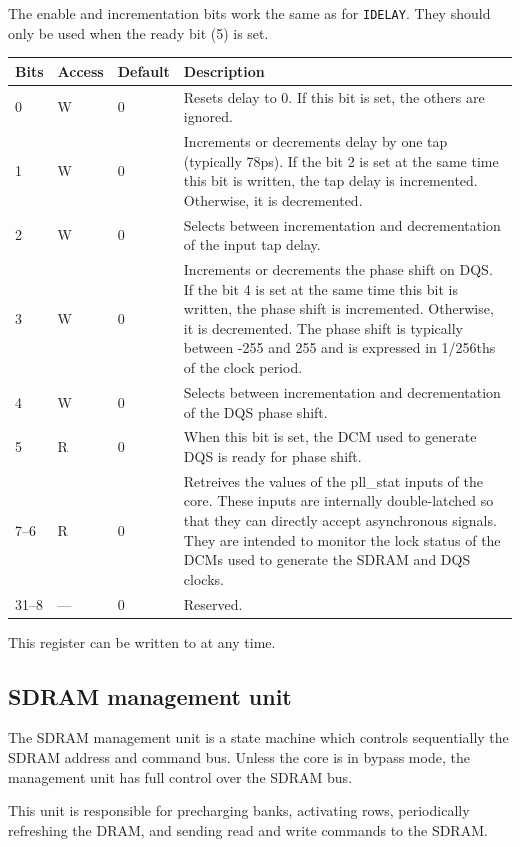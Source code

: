 \documentclass[a4paper,11pt]{article}
\begin{document}
The enable and incrementation bits work the same as for \verb!IDELAY!. They should only be used when the ready bit (5) is set.\\

\begin{tabularx}{\textwidth}{|l|l|l|X|}
\hline
\bf Bits & \bf Access & \bf Default & \bf Description \\
\hline
0 & W & 0 & Resets delay to 0. If this bit is set, the others are ignored. \\
\hline
1 & W & 0 & Increments or decrements delay by one tap (typically 78ps). If the bit 2 is set at the same time this bit is written, the tap delay is incremented. Otherwise, it is decremented. \\
\hline
2 & W & 0 & Selects between incrementation and decrementation of the input tap delay. \\
\hline
3 & W & 0 & Increments or decrements the phase shift on DQS. If the bit 4 is set at the same time this bit is written, the phase shift is incremented. Otherwise, it is decremented. The phase shift is typically between -255 and 255 and is expressed in 1/256ths of the clock period. \\
\hline
4 & W & 0 & Selects between incrementation and decrementation of the DQS phase shift. \\
\hline
5 & R & 0 & When this bit is set, the DCM used to generate DQS is ready for phase shift. \\
\hline
7--6 & R & 0 & Retreives the values of the pll\_stat inputs of the core. These inputs are internally double-latched so that they can directly accept asynchronous signals. They are intended to monitor the lock status of the DCMs used to generate the SDRAM and DQS clocks. \\
\hline
31--8 & --- & 0 & Reserved. \\
\hline
\end{tabularx}

This register can be written to at any time.


\subsection{SDRAM management unit}
The SDRAM management unit is a state machine which controls sequentially the SDRAM address and command bus. Unless the core is in bypass mode, the management unit has full control over the SDRAM bus.

This unit is responsible for precharging banks, activating rows, periodically refreshing the DRAM, and sending read and write commands to the SDRAM.
\end{document}
